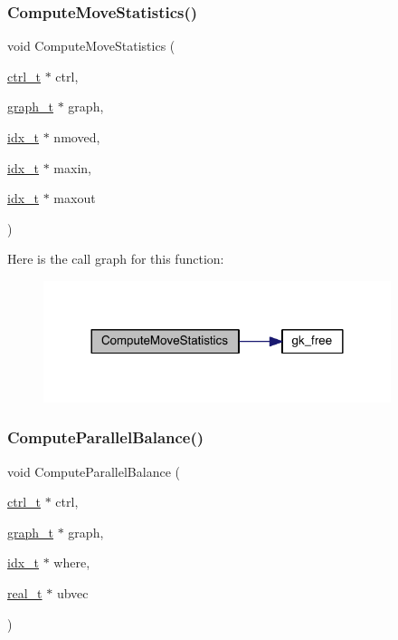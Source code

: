 \subsubsection{\texorpdfstring{Compute\+Move\+Statistics()}{ComputeMoveStatistics()}}
{\footnotesize\ttfamily void Compute\+Move\+Statistics (\begin{DoxyParamCaption}\item[{\hyperlink{a00742}{ctrl\+\_\+t} $\ast$}]{ctrl,  }\item[{\hyperlink{a00734}{graph\+\_\+t} $\ast$}]{graph,  }\item[{\hyperlink{a00876_aaa5262be3e700770163401acb0150f52}{idx\+\_\+t} $\ast$}]{nmoved,  }\item[{\hyperlink{a00876_aaa5262be3e700770163401acb0150f52}{idx\+\_\+t} $\ast$}]{maxin,  }\item[{\hyperlink{a00876_aaa5262be3e700770163401acb0150f52}{idx\+\_\+t} $\ast$}]{maxout }\end{DoxyParamCaption})}

Here is the call graph for this function\+:\nopagebreak
\begin{figure}[H]
\begin{center}
\leavevmode
\includegraphics[width=288pt]{a00969_aa0a183e7221e2e7b4010355c77fa36c5_cgraph}
\end{center}
\end{figure}
\mbox{\label{a00969_aab34140bbbccdd5b71308b7833812e4c}} 
\subsubsection{\texorpdfstring{Compute\+Parallel\+Balance()}{ComputeParallelBalance()}}
{\footnotesize\ttfamily void Compute\+Parallel\+Balance (\begin{DoxyParamCaption}\item[{\hyperlink{a00742}{ctrl\+\_\+t} $\ast$}]{ctrl,  }\item[{\hyperlink{a00734}{graph\+\_\+t} $\ast$}]{graph,  }\item[{\hyperlink{a00876_aaa5262be3e700770163401acb0150f52}{idx\+\_\+t} $\ast$}]{where,  }\item[{\hyperlink{a00876_a1924a4f6907cc3833213aba1f07fcbe9}{real\+\_\+t} $\ast$}]{ubvec }\end{DoxyParamCaption})}


